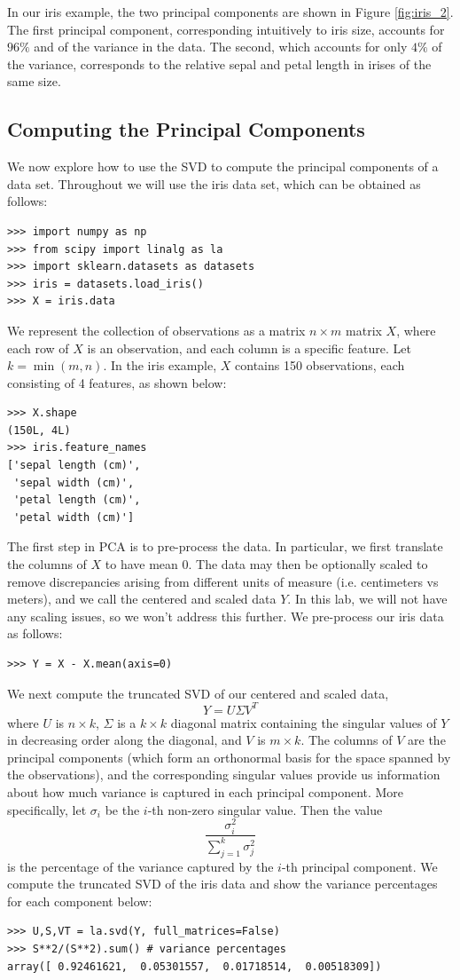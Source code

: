 In our iris example, the two principal components are shown in Figure \ref{fig:iris_2}. The first principal component, corresponding intuitively to iris size, accounts for $96\%$ and of the variance in the data. The second, which accounts for only $4\%$ of the variance, corresponds to the relative sepal and petal length in irises of the same size.

\subsection*{Computing the Principal Components}
We now explore how to use the SVD to compute the principal components of a data set.
Throughout we will use the iris data set, which can be obtained as follows:
\begin{lstlisting}
>>> import numpy as np
>>> from scipy import linalg as la
>>> import sklearn.datasets as datasets
>>> iris = datasets.load_iris()
>>> X = iris.data
\end{lstlisting}
We represent the collection of observations as a matrix $n \times m$ matrix $X$, where each row of $X$ is an observation, and each column is a specific feature.
Let $k = \min(m,n)$. 
In the iris example, $X$ contains 150 observations, each consisting of 4 features, as shown below:
\begin{lstlisting}
>>> X.shape
(150L, 4L)
>>> iris.feature_names
['sepal length (cm)',
 'sepal width (cm)',
 'petal length (cm)',
 'petal width (cm)']
\end{lstlisting}

The first step in PCA is to pre-process the data. In particular, we first translate the columns of $X$ to have mean 0. 
The data may then be optionally scaled to remove discrepancies arising from different units of measure (i.e. centimeters vs meters), and we call the centered and scaled data $Y$.
In this lab, we will not have any scaling issues, so we won't address this further.
We pre-process our iris data as follows:
\begin{lstlisting}
>>> Y = X - X.mean(axis=0)
\end{lstlisting}

We next compute the truncated SVD of our centered and scaled data,
\[Y = U\Sigma V^{T}\]
where $U$ is $n \times k$, $\Sigma$ is a $k\times k$ diagonal matrix containing the singular values of $Y$ in decreasing order along the diagonal, and $V$ is $m \times k$. The columns of $V$ are the principal components (which form an orthonormal basis for the space spanned by the observations), and the corresponding singular values provide us information about how much variance is captured in each principal component. More specifically, let $\sigma_{i}$ be the $i$-th non-zero singular value. Then the value
\[\frac{\sigma^2_{i}}{\sum_{j=1}^{k} \sigma^2_{j}}\]
is the percentage of the variance captured by the $i$-th principal component.
We compute the truncated SVD of the iris data and show the variance percentages for each component below:
\begin{lstlisting}
>>> U,S,VT = la.svd(Y, full_matrices=False)
>>> S**2/(S**2).sum() # variance percentages
array([ 0.92461621,  0.05301557,  0.01718514,  0.00518309])
\end{lstlisting}

